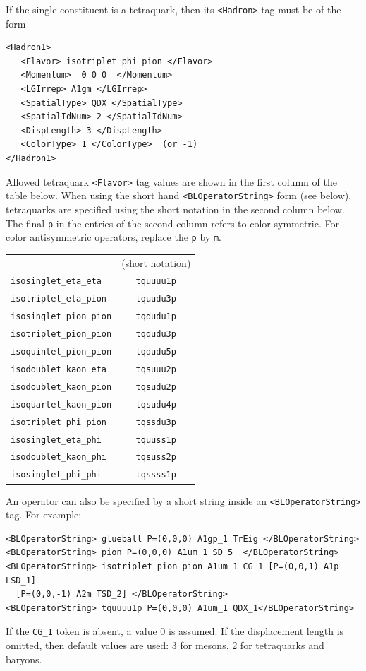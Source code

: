\documentclass[12pt]{article}
\renewcommand{\arraystretch}{1.4}
\newcommand{\vb}{\texttt}
\begin{document}
If the single constituent is a tetraquark, then its \vb{<Hadron>}
tag must be of the form
\begin{verbatim}
<Hadron1>
   <Flavor> isotriplet_phi_pion </Flavor>
   <Momentum>  0 0 0  </Momentum>
   <LGIrrep> A1gm </LGIrrep>
   <SpatialType> QDX </SpatialType>
   <SpatialIdNum> 2 </SpatialIdNum>
   <DispLength> 3 </DispLength>
   <ColorType> 1 </ColorType>  (or -1)
</Hadron1>
\end{verbatim}
Allowed tetraquark \vb{<Flavor>} tag values are shown in
the first column of the table below.  When using the
short hand \vb{<BLOperatorString>} form (see below),
tetraquarks are specified using the short notation in
the second column below.  The final \vb{p} in the
entries of the second column refers to color symmetric.
For color antisymmetric operators, replace the \vb{p}
by \vb{m}.
\begin{center}\renewcommand{\arraystretch}{1.0}
\begin{tabular}{lc}
 &                        (short notation)\\
\vb{isosinglet\_eta\_eta}   & \vb{tquuuu1p}\\
\vb{isotriplet\_eta\_pion}  & \vb{tquudu3p}\\
\vb{isosinglet\_pion\_pion} & \vb{tqdudu1p}\\
\vb{isotriplet\_pion\_pion} & \vb{tqdudu3p}\\
\vb{isoquintet\_pion\_pion} & \vb{tqdudu5p}\\
\vb{isodoublet\_kaon\_eta}  & \vb{tqsuuu2p}\\
\vb{isodoublet\_kaon\_pion} & \vb{tqsudu2p}\\
\vb{isoquartet\_kaon\_pion} & \vb{tqsudu4p}\\
\vb{isotriplet\_phi\_pion}  & \vb{tqssdu3p}\\
\vb{isosinglet\_eta\_phi}   & \vb{tquuss1p}\\
\vb{isodoublet\_kaon\_phi}  & \vb{tqsuss2p}\\
\vb{isosinglet\_phi\_phi}   & \vb{tqssss1p}
\end{tabular}
\end{center}

An operator can also be specified by a short string inside an
\vb{<BLOperatorString>} tag.  For example:
\begin{verbatim}
<BLOperatorString> glueball P=(0,0,0) A1gp_1 TrEig </BLOperatorString>
<BLOperatorString> pion P=(0,0,0) A1um_1 SD_5  </BLOperatorString>
<BLOperatorString> isotriplet_pion_pion A1um_1 CG_1 [P=(0,0,1) A1p LSD_1]
  [P=(0,0,-1) A2m TSD_2] </BLOperatorString>
<BLOperatorString> tquuuu1p P=(0,0,0) A1um_1 QDX_1</BLOperatorString>
\end{verbatim}
If the \vb{CG\_1} token is absent, a value 0 is assumed.
If the displacement length is omitted, then default values are used: 
3 for mesons, 2 for tetraquarks and baryons.
\end{document}
